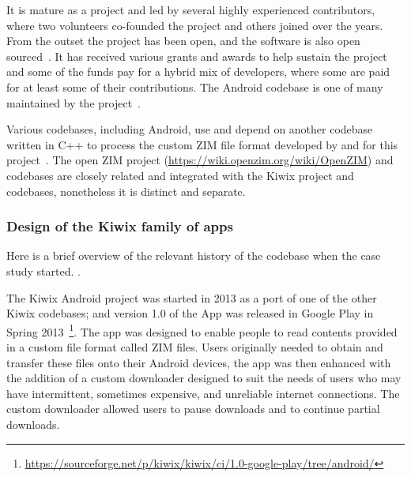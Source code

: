 It is mature as a project and led by several highly experienced contributors, where two volunteers co-founded the project and others joined over the years. From the outset the project has been open, and the software is also open sourced~\citep{sutherland2014_wikimedia_on_kelson}. It has received various grants and awards to help sustain the project and some of the funds pay for a hybrid mix of developers, where some are paid for at least some of their contributions. The Android codebase is one of many maintained by the project~\citep{gaudin2017_wikimedia_kiwix_android}. 

Various codebases, including Android, use and depend on another codebase written in C++ to process the custom ZIM file format developed by and for this project~\citep{gaudin2017_wikimedia_kiwix_android}. The open ZIM project (\url{https://wiki.openzim.org/wiki/OpenZIM}) and codebases are closely related and integrated with the Kiwix project and codebases, nonetheless it is distinct and separate.

\subsubsection{Design of the Kiwix family of apps}
Here is a brief overview of the relevant history of the codebase when the case study started. .

The Kiwix Android project was started in 2013 as a port of one of the other Kiwix codebases; and version 1.0 of the App was released in Google Play in Spring 2013~\footnote{\url{https://sourceforge.net/p/kiwix/kiwix/ci/1.0-google-play/tree/android/}}. The app was designed to enable people to read contents provided in a custom file format called ZIM files. Users originally needed to obtain and transfer these files onto their Android devices, the app was then enhanced with the addition of a custom downloader designed to suit the needs of users who may have intermittent, sometimes expensive, and unreliable internet connections. The custom downloader allowed users to pause downloads and to continue partial downloads.

